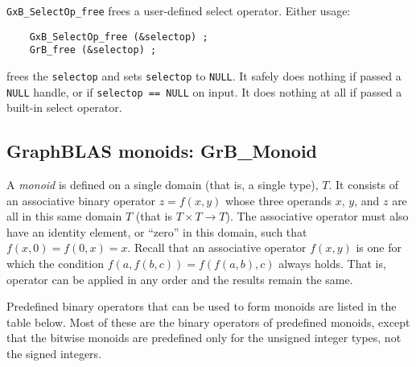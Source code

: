 \documentclass[12pt]{article}
\begin{document}
\verb'GxB_SelectOp_free' frees a user-defined select operator.  Either usage:

    {\small
    \begin{verbatim}
    GxB_SelectOp_free (&selectop) ;
    GrB_free (&selectop) ; \end{verbatim}}

\noindent
frees the \verb'selectop' and sets \verb'selectop' to \verb'NULL'.  It safely
does nothing if passed a \verb'NULL' handle, or if \verb'selectop == NULL' on
input.  It does nothing at all if passed a built-in select operator.

\newpage
\subsection{GraphBLAS monoids: {\sf GrB\_Monoid}} %
\label{monoid}

A {\em monoid} is defined on a single domain (that is, a single type), $T$.  It
consists of an associative binary operator $z=f(x,y)$ whose three operands $x$,
$y$, and $z$ are all in this same domain $T$ (that is $T \times T \rightarrow
T$).  The associative operator must also have an identity element, or ``zero''
in this domain, such that $f(x,0)=f(0,x)=x$.  Recall that an associative
operator $f(x,y)$ is one for which the condition $f(a, f(b,c)) = f(f (a,b),c)$
always holds.  That is, operator can be applied in any order and the results
remain the same.

Predefined binary operators that can be used to form monoids are listed in the
table below.  Most of these are the binary operators of predefined monoids,
except that the bitwise monoids are predefined only for the unsigned integer
types, not the signed integers.
\end{document}
